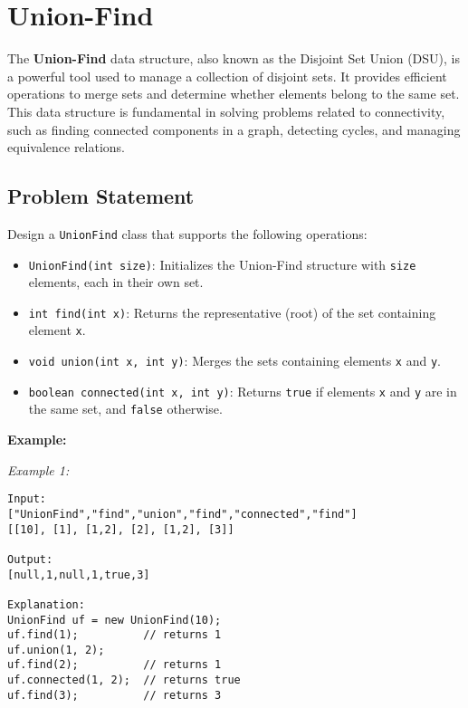 
\chapter{Union-Find}
\label{chap:union_find}

The \textbf{Union-Find} data structure, also known as the Disjoint Set Union (DSU), is a powerful tool used to manage a collection of disjoint sets. It provides efficient operations to merge sets and determine whether elements belong to the same set. This data structure is fundamental in solving problems related to connectivity, such as finding connected components in a graph, detecting cycles, and managing equivalence relations.

\section*{Problem Statement}

Design a \texttt{UnionFind} class that supports the following operations:

\begin{itemize}
    \item \texttt{UnionFind(int size)}: Initializes the Union-Find structure with \texttt{size} elements, each in their own set.
    \item \texttt{int find(int x)}: Returns the representative (root) of the set containing element \texttt{x}.
    \item \texttt{void union(int x, int y)}: Merges the sets containing elements \texttt{x} and \texttt{y}.
    \item \texttt{boolean connected(int x, int y)}: Returns \texttt{true} if elements \texttt{x} and \texttt{y} are in the same set, and \texttt{false} otherwise.
\end{itemize}

\textbf{Example:}

\textit{Example 1:}

\begin{verbatim}
Input:
["UnionFind","find","union","find","connected","find"]
[[10], [1], [1,2], [2], [1,2], [3]]

Output:
[null,1,null,1,true,3]

Explanation:
UnionFind uf = new UnionFind(10);
uf.find(1);          // returns 1
uf.union(1, 2);
uf.find(2);          // returns 1
uf.connected(1, 2);  // returns true
uf.find(3);          // returns 3
\end{verbatim}

